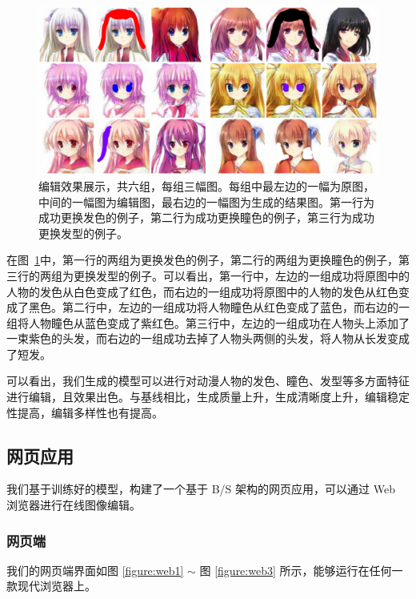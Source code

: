 \documentclass[a4paper,12pt,UTF8]{ctexart}
\newcommand{\kai}{\CJKfamily{zhkai}}	%
\begin{document}
\begin{figure}[H]
  \centering
  \includegraphics[width=0.9\linewidth]{figs/pic.png}
  \caption{\kai 编辑效果展示，共六组，每组三幅图。每组中最左边的一幅为原图，中间的一幅图为编辑图，最右边的一幅图为生成的结果图。第一行为成功更换发色的例子，第二行为成功更换瞳色的例子，第三行为成功更换发型的例子。}
  \label{fig:pic}
\end{figure}



在图~\ref{fig:pic}中，第一行的两组为更换发色的例子，第二行的两组为更换瞳色的例子，第三行的两组为更换发型的例子。可以看出，第一行中，左边的一组成功将原图中的人物的发色从白色变成了红色，而右边的一组成功将原图中的人物的发色从红色变成了黑色。第二行中，左边的一组成功将人物瞳色从红色变成了蓝色，而右边的一组将人物瞳色从蓝色变成了紫红色。第三行中，左边的一组成功在人物头上添加了一束紫色的头发，而右边的一组成功去掉了人物头两侧的头发，将人物从长发变成了短发。

可以看出，我们生成的模型可以进行对动漫人物的发色、瞳色、发型等多方面特征进行编辑，且效果出色。与基线相比，生成质量上升，生成清晰度上升，编辑稳定性提高，编辑多样性也有提高。

\subsection{网页应用}

我们基于训练好的模型，构建了一个基于 B/S 架构的网页应用，可以通过 Web 浏览器进行在线图像编辑。

\subsubsection{网页端}
我们的网页端界面如图 \ref{figure:web1} $\sim$ 图 \ref{figure:web3}  所示，能够运行在任何一款现代浏览器上。
\end{document}
